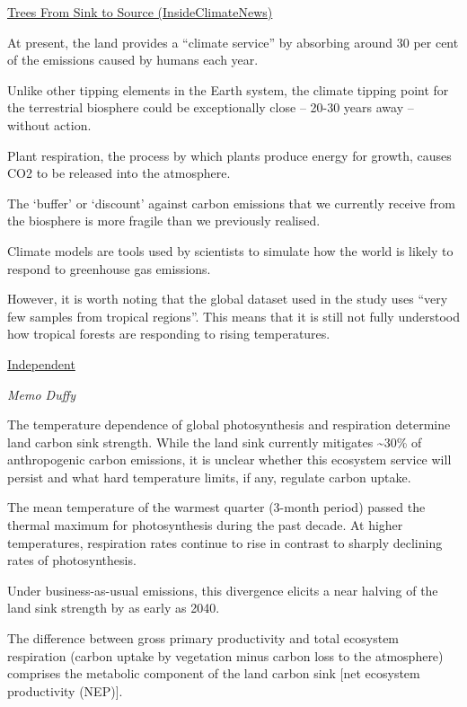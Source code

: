 \documentclass[
]{book}
\begin{document}
\href{https://insideclimatenews.org/news/13012021/forests-heat-climate-change/}{Trees From Sink to Source (InsideClimateNews)}

At present, the land provides a ``climate service'' by absorbing
around 30 per cent of the emissions caused by humans each year.

Unlike other tipping elements in the Earth system, the climate tipping point
for the terrestrial biosphere could be exceptionally close --
20-30 years away -- without action.

Plant respiration, the process by which plants produce energy for growth,
causes CO2 to be released into the atmosphere.

The `buffer' or `discount' against carbon emissions that we currently receive from the biosphere is more fragile than we previously realised.

Climate models are tools used by scientists to simulate how the world is likely to respond to greenhouse gas emissions.

However, it is worth noting that the global dataset used in the study
uses ``very few samples from tropical regions''.
This means that it is still not fully understood how tropical forests
are responding to rising temperatures.

\href{https://www.independent.co.uk/environment/climate-change/land-ecosystems-tipping-point-temperature-b1786822.html}{Independent}

\emph{Memo Duffy}

The temperature dependence of global photosynthesis and respiration
determine land carbon sink strength.
While the land sink currently mitigates \textasciitilde30\% of anthropogenic carbon emissions,
it is unclear whether this ecosystem service will persist and
what hard temperature limits, if any, regulate carbon uptake.

The mean temperature of the warmest quarter (3-month period)
passed the thermal maximum for photosynthesis during the past decade.
At higher temperatures, respiration rates continue to rise
in contrast to sharply declining rates of photosynthesis.

Under business-as-usual emissions, this divergence elicits a
near halving of the land sink strength by as early as 2040.

The difference between gross primary productivity
and total ecosystem respiration
(carbon uptake by vegetation minus carbon loss to the atmosphere)
comprises the metabolic component of the land carbon
sink {[}net ecosystem productivity (NEP){]}.
\end{document}

